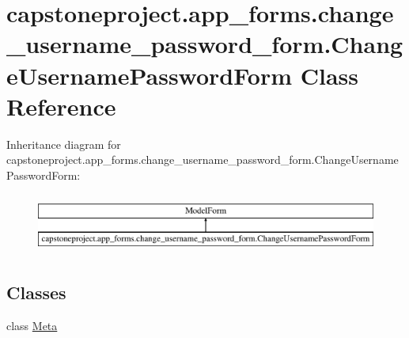 \hypertarget{classcapstoneproject_1_1app__forms_1_1change__username__password__form_1_1_change_username_password_form}{}\section{capstoneproject.\+app\+\_\+forms.\+change\+\_\+username\+\_\+password\+\_\+form.\+Change\+Username\+Password\+Form Class Reference}
\label{classcapstoneproject_1_1app__forms_1_1change__username__password__form_1_1_change_username_password_form}
Inheritance diagram for capstoneproject.\+app\+\_\+forms.\+change\+\_\+username\+\_\+password\+\_\+form.\+Change\+Username\+Password\+Form\+:\begin{figure}[H]
\begin{center}
\leavevmode
\includegraphics[height=1.992882cm]{classcapstoneproject_1_1app__forms_1_1change__username__password__form_1_1_change_username_password_form}
\end{center}
\end{figure}
\subsection*{Classes}
\begin{DoxyCompactItemize}
\item 
class \mbox{\hyperlink{classcapstoneproject_1_1app__forms_1_1change__username__password__form_1_1_change_username_password_form_1_1_meta}{Meta}}
\end{DoxyCompactItemize}
